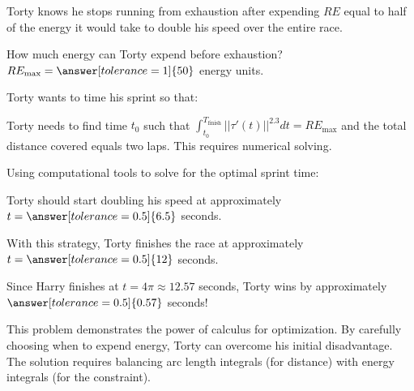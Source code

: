 \documentclass{ximera}
\begin{document}
\begin{problem}
    Torty knows he stops running from exhaustion after expending $RE$ equal to half of the energy it would take to double his speed over the entire race.
    
    How much energy can Torty expend before exhaustion? $RE_{\text{max}}=\answer[tolerance=1]{50}$ energy units.
    
    Torty wants to time his sprint so that:
    \begin{selectAll}
    \end{selectAll}
    
    \begin{feedback}
        Torty needs to find time $t_0$ such that $\int_{t_0}^{T_{\text{finish}}} ||\tau'(t)||^{2.3}dt=RE_{\text{max}}$ and the total distance covered equals two laps. This requires numerical solving.
    \end{feedback}
\end{problem}

\begin{problem}
    Using computational tools to solve for the optimal sprint time:
    
    Torty should start doubling his speed at approximately $t=\answer[tolerance=0.5]{6.5}$ seconds.
    
    With this strategy, Torty finishes the race at approximately $t=\answer[tolerance=0.5]{12}$ seconds.
    
    Since Harry finishes at $t=4\pi\approx 12.57$ seconds, Torty wins by approximately $\answer[tolerance=0.5]{0.57}$ seconds!
    
    \begin{feedback}
        This problem demonstrates the power of calculus for optimization. By carefully choosing when to expend energy, Torty can overcome his initial disadvantage. The solution requires balancing arc length integrals (for distance) with energy integrals (for the constraint).
    \end{feedback}
\end{problem}
\end{document}
